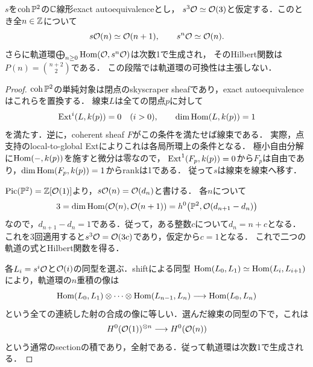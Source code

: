 \documentclass[11pt,a4paper]{ltjsarticle}
\begin{document}
\begin{lemma}[射影平面上のexactな三乗根の軌道]
\label{lem:v7-plane-root-orbit}
$s$を$\operatorname{coh}\mathbb P^2$の$\mathbb C$線形exact autoequivalenceとし，
$s^3\mathcal O\simeq\mathcal O(3)$と仮定する．このとき全$n\in\mathbb Z$について
\[
 s\mathcal O(n)\simeq\mathcal O(n+1),\qquad s^n\mathcal O\simeq\mathcal O(n).
\]
さらに軌道環$\bigoplus_{n\geq0}\operatorname{Hom}(\mathcal O,s^n\mathcal O)$は次数1で生成され，
そのHilbert関数は$P(n)=\binom{n+2}{2}$である．
この段階では軌道環の可換性は主張しない．
\end{lemma}
\begin{proof}
$\operatorname{coh}\mathbb P^2$の単純対象は閉点のskyscraper sheafであり，exact autoequivalenceはこれらを置換する．
線束$L$は全ての閉点$p$に対して
\[
 \operatorname{Ext}^i(L,k(p))=0\quad(i>0),\qquad\dim\operatorname{Hom}(L,k(p))=1
\]
を満たす．逆に，coherent sheaf $F$がこの条件を満たせば線束である．
実際，点支持のlocal-to-global Extによりこれは各局所環上の条件となる．
極小自由分解に$\operatorname{Hom}(-,k(p))$を施すと微分は零なので，
$\operatorname{Ext}^1(F_p,k(p))=0$から$F_p$は自由であり，$\dim\operatorname{Hom}(F_p,k(p))=1$からrankは1である．
従って$s$は線束を線束へ移す．

$\operatorname{Pic}(\mathbb P^2)=\mathbb Z[\mathcal O(1)]$より，$s\mathcal O(n)=\mathcal O(d_n)$と書ける．
各$n$について
\[
 3=\dim\operatorname{Hom}(\mathcal O(n),\mathcal O(n+1))
 =h^0\bigl(\mathbb P^2,\mathcal O(d_{n+1}-d_n)\bigr)
\]
なので，$d_{n+1}-d_n=1$である．従って，ある整数$c$について$d_n=n+c$となる．
これを3回適用すると$s^3\mathcal O=\mathcal O(3c)$であり，仮定から$c=1$となる．
これで二つの軌道の式とHilbert関数を得る．

各$L_i=s^i\mathcal O$と$\mathcal O(i)$の同型を選ぶ．shiftによる同型
$\operatorname{Hom}(L_0,L_1)\simeq\operatorname{Hom}(L_i,L_{i+1})$により，軌道環の$n$重積の像は
\[
 \operatorname{Hom}(L_0,L_1)\otimes\cdots\otimes\operatorname{Hom}(L_{n-1},L_n)
 \longrightarrow\operatorname{Hom}(L_0,L_n)
\]
という全ての連続した射の合成の像に等しい．選んだ線束の同型の下で，これは
\[
 H^0(\mathcal O(1))^{\otimes n}\longrightarrow H^0(\mathcal O(n))
\]
という通常のsectionの積であり，全射である．従って軌道環は次数1で生成される．
\end{proof}
\end{document}

